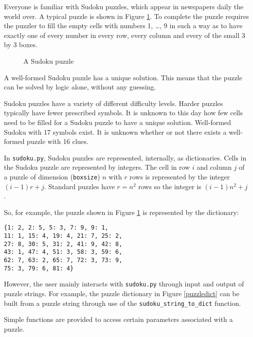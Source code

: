 Everyone is familiar with Sudoku puzzles, which appear in newspapers daily the world over. A typical puzzle is shown in Figure \ref{sudokuexampleone}. To complete the puzzle requires the puzzler to fill the empty cells with numbers 1, \ldots , 9 in such a way as to have exactly one of every number in every row, every column and every of the small 3 by 3 boxes.

\begin{figure}[h]
\label{sudokuexampleone}
\centering
  \sudokuexampleone
\caption{A Sudoku puzzle}
\end{figure}

A well-formed Sudoku puzzle has a unique solution. This means that the puzzle can be solved by logic alone, without any guessing.

Sudoku puzzles have a variety of different difficulty levels. Harder puzzles typically have fewer prescribed symbols. It is unknown to this day how few cells need to be filled for a Sudoku puzzle to have a unique solution. Well-formed Sudoku with 17 symbols exist. It is unknown whether or not there exists a well-formed puzzle with 16 clues.

In \texttt{sudoku.py}, Sudoku puzzles are represented, internally, as dictionaries. Cells in the Sudoku puzzle are represented by integers. The cell in row $i$ and column $j$ of a puzzle of dimension (\texttt{boxsize}) $n$ with $r$ rows is represented by the integer $(i - 1)r + j$. Standard puzzles have $r = n^2$ rows so the integer is $(i - 1)n^2 + j$. 

So, for example, the puzzle shown in Figure \ref{sudokuexampleone} is represented by the dictionary:

\begin{lstlisting}[caption=Sudoku puzzle dictionary,label=puzzledict]
{1: 2, 2: 5, 5: 3, 7: 9, 9: 1, 
11: 1, 15: 4, 19: 4, 21: 7, 25: 2, 
27: 8, 30: 5, 31: 2, 41: 9, 42: 8, 
43: 1, 47: 4, 51: 3, 58: 3, 59: 6, 
62: 7, 63: 2, 65: 7, 72: 3, 73: 9, 
75: 3, 79: 6, 81: 4}
\end{lstlisting}

However, the user mainly interacts with \texttt{sudoku.py} through input and output of puzzle strings. For example, the puzzle dictionary in Figure \ref{puzzledict} can be built from a puzzle string through use of the \texttt{sudoku\_string\_to\_dict} function.



Simple functions are provided to access certain parameters associated with a puzzle.



